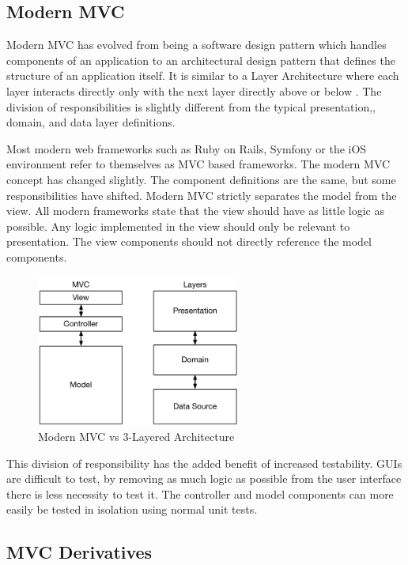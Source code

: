 \subsection{Modern MVC}

Modern MVC has evolved from being a software design pattern which handles components of an application to an architectural design pattern that defines the structure of an application itself. It is similar to a Layer Architecture where each layer interacts directly only with the next layer directly above or below \cite{patterns}. The division of responsibilities is slightly different from the typical presentation,, domain, and data layer definitions.

Most modern web frameworks such as Ruby on Rails, Symfony or the iOS environment refer to themselves as MVC based frameworks. The modern MVC concept has changed slightly. The component definitions are the same, but some responsibilities have shifted. Modern MVC strictly separates the model from the view. All modern frameworks state that the view should have as little logic as possible. Any logic implemented in the view should only be relevant to presentation. The view components should not directly reference the model components\cite{apple_MVC}\cite{symfony_MVC}.


\begin{figure}[H]
    \centering
    \includegraphics[height=5cm,keepaspectratio]{assets/concept/mvc_2.pdf}
    \caption{Modern MVC vs 3-Layered Architecture}
    \label{fig:mvc_2}
\end{figure}

This division of responsibility has the added benefit of increased testability. GUIs are difficult to test, by removing as much logic as possible from the user interface there is less necessity to test it. The controller and model components can more easily be tested in isolation using normal unit tests\cite{mvp_testing}.

\subsection{MVC Derivatives}

